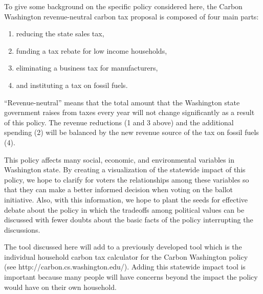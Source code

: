 \documentclass{sigchi}
\begin{document}
To give some background on the specific policy considered here, the Carbon Washington revenue-neutral carbon tax proposal is composed of four main parts: 
\begin{enumerate}
\item reducing the state sales tax,
\item funding a tax rebate for low income households,
\item eliminating a business tax for manufacturers,
\item and instituting a tax on fossil fuels.
\end{enumerate}
“Revenue-neutral” means that the total amount that the Washington state government raises 
from taxes every year will not change significantly as a result of this policy. The revenue 
reductions (1 and 3 above) and the additional spending (2) will be balanced by the new 
revenue source of the tax on fossil fuels (4).  

This policy affects many social, economic, and environmental variables in Washington state. By creating a visualization of the statewide impact of this policy, we hope to clarify for voters the relationships among these variables so that they can make a better informed decision when voting on the ballot initiative. Also, with this information, we hope to plant the seeds for effective debate about the policy in which the tradeoffs among political values can be discussed with fewer doubts about the basic facts of the policy interrupting the discussions.

The tool discussed here will add to a previously developed tool which is the individual household carbon tax calculator for the Carbon Washington policy (see http://carbon.cs.washington.edu/). Adding this statewide impact tool is important because many people will have concerns beyond the impact the policy would have on their own household. 
\end{document}
